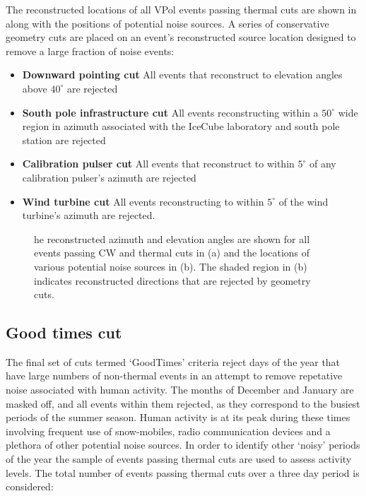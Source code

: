 The reconstructed locations of all VPol events passing thermal cuts are shown in  along with the positions of potential noise sources. A series of conservative geometry cuts are placed on an event’s reconstructed source location designed to remove a large fraction of noise events:

\begin{itemize}

\item \textbf{Downward pointing cut} All events that reconstruct to elevation angles above $40^\circ$ are rejected

\item \textbf{South pole infrastructure cut} All events reconstructing within a $50^\circ$ wide region in azimuth associated with the IceCube laboratory and south pole station are rejected

\item \textbf{Calibration pulser cut} All events that reconstruct to within $5^\circ$ of any calibration pulser's azimuth are rejected

\item \textbf{Wind turbine cut} All events reconstructing to within $5^\circ$ of the wind turbine's azimuth are rejected.

\end{itemize}

\begin{figure}[htpb]
  \hfill
  \caption{he reconstructed azimuth and elevation angles are shown for all events passing CW and thermal cuts in (a) and the locations of various potential noise sources in (b). The shaded region in (b) indicates reconstructed directions that are rejected by geometry cuts.}
  \label{fig:Analysis:Anthroprogenic-Cuts:Geometry-Cuts:VPol-Reco}
\end{figure}

\subsection{Good times cut}
\label{sec:Analysis:Anthroprogenic-Cuts:Good-Times}
The final set of cuts termed `GoodTimes' criteria reject days of the year that have large numbers of non-thermal events in an attempt to remove repetative noise associated with human activity. The months of December and January are masked off, and all events within them rejected, as they correspond to the busiest periods of the summer season. Human activity is at its peak during these times involving frequent use of snow-mobiles, radio communication devices and a plethora of other potential noise sources. In order to identify other `noisy' periods of the year the sample of events passing thermal cuts are used to assess activity levels. The total number of events passing thermal cuts over a three day period is considered:

